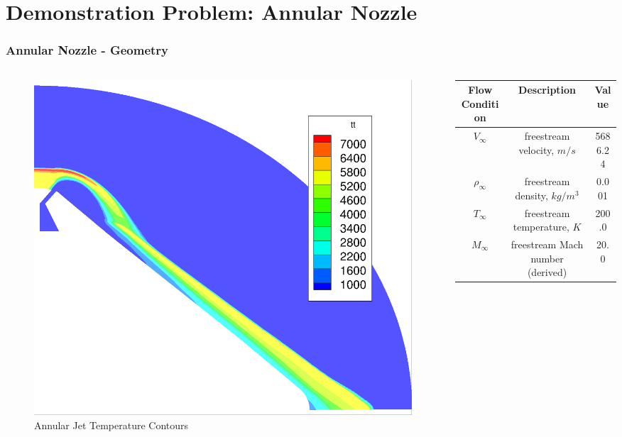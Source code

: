 \documentclass{beamer}
\begin{document}
\section{Demonstration Problem: Annular Nozzle}
\begin{frame}
  \frametitle{Annular Nozzle - Geometry}
  \begin{columns}
    \begin{column}{0.4\textwidth}
     \begin{figure}
       \centering
        \includegraphics[width=\textwidth]{figures/flow-viz.png}
       \caption{Annular Jet Temperature Contours}
       \label{fig:annular-jet-flow}
     \end{figure}
    \end{column}
    \begin{column}{0.6\textwidth}
      \begin{table}
        \tiny
        \centering
        \begin{tabular}{c|c|c}
          Flow Condition & Description & Value \\
          \hline
          $V_{\infty}$    & freestream velocity, $m/s$        & 5686.24 \\
          $\rho_{\infty}$ & freestream density, $kg/m^3$      & 0.001 \\
          $T_{\infty}$    & freestream temperature, $K$       & 200.0 \\
          $M_{\infty}$    & freestream Mach number (derived)  & 20.0

\end{tabular}
\end{table}
\end{column}
\end{columns}
\end{frame}
\end{document}
